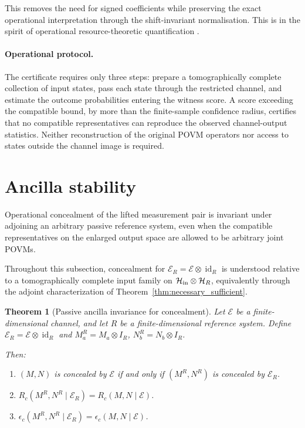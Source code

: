 \documentclass[
aps,pra,twocolumn,10pt,
superscriptaddress,longbibliography,floatfix
]{revtex4-2}
\DeclareMathOperator{\id}{id}
\newtheorem{theorem}{Theorem}[section]
\begin{document}
This removes the need for signed coefficients while preserving the exact operational interpretation through the shift-invariant normalisation. This is in the spirit of operational resource-theoretic quantification \cite{Regula2018,Takagi2019,Skrzypczyk2019}.

\paragraph*{Operational protocol.}
The certificate requires only three steps: prepare a tomographically complete collection of input states, pass each state through the restricted channel, and estimate the outcome probabilities entering the witness score. A score exceeding the compatible bound, by more than the finite-sample confidence radius, certifies that no compatible representatives can reproduce the observed channel-output statistics. Neither reconstruction of the original POVM operators nor access to states outside the channel image is required.

\section{Ancilla stability}
\label{sec:ancilla}

Operational concealment of the lifted measurement pair is invariant under adjoining an arbitrary passive reference system, even when the compatible representatives on the enlarged output space are allowed to be arbitrary joint POVMs.

Throughout this subsection, concealment for $\mathcal E_R=\mathcal E\otimes\id_R$ is understood relative to a tomographically complete input family on $\mathcal H_{\rm in}\otimes\mathcal H_R$, equivalently through the adjoint characterization of Theorem~\ref{thm:necessary_sufficient}.

\begin{theorem}[Passive ancilla invariance for concealment]
\label{thm:ancilla_stability}
Let $\mathcal E$ be a finite-dimensional channel, and let $R$ be a finite-dimensional reference system. Define $\mathcal E_R=\mathcal E\otimes\id_R$ and $M^R_a=M_a\otimes I_R$, $N^R_b=N_b\otimes I_R$.

Then:
\begin{enumerate}
\item $(M,N)$ is concealed by $\mathcal E$ if and only if $(M^R,N^R)$ is concealed by $\mathcal E_R$.
\item $R_c(M^R,N^R\mid\mathcal E_R)=R_c(M,N\mid\mathcal E)$.
\item $\epsilon_c(M^R,N^R\mid\mathcal E_R)=\epsilon_c(M,N\mid\mathcal E)$.
\end{enumerate}
\end{theorem}
\end{document}
